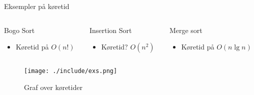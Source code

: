 \documentclass[12pt,t]{beamer}
\begin{document}
    \begin{frame}[t]{Eksempler på køretid}
        \vspace{-2em}
        \begin{columns}
            \begin{column}{0.33\textwidth}
                \begin{block}{Bogo Sort}
                    \begin{itemize}
                        \item Køretid på $O(n!)$
                    \end{itemize}
                \end{block}
            \end{column}
            \begin{column}{0.33\textwidth}
                \begin{block}{Insertion Sort}
                    \begin{itemize}
                        \item Køretid? $O(n^2)$
                    \end{itemize}
                \end{block}
            \end{column}

            \begin{column}{0.33\textwidth}
                \begin{block}{Merge sort}
                    \begin{itemize}
                        \item Køretid på $O(n \lg n)$
                    \end{itemize}
                \end{block}
            \end{column}
        \end{columns}
        \begin{figure}[h!]
            \caption{Graf over køretider}
            \centering
            \texttt{[image: ./include/exs.png]}
        \end{figure}
    \end{frame}
\end{document}
